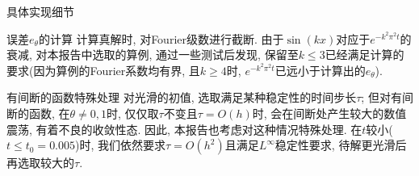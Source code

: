 \documentclass{article}
\begin{document}
\begin{section}{具体实现细节}
\begin{subsection}{误差$e_\theta$的计算}
        计算真解时, 对Fourier级数进行截断. 由于$\sin(kx)$对应于$e^{-k^2\pi^2t}$的衰减, 对本报告中选取的算例, 通过一些测试后发现, 
        保留至$k\leq 3$已经满足计算的要求(因为算例的Fourier系数均有界, 且$k\geq 4$时, $e^{-k^2\pi^2 t}$已远小于计算出的$e_\theta$).
    \end{subsection}
    \begin{subsection}{有间断的函数特殊处理}
        对光滑的初值, 选取满足某种稳定性的时间步长$\tau$; 但对有间断的函数, 在$\theta\neq 0,1$时, 仅仅取$\tau$不变且$\tau=O(h)$时, 会在间断处产生较大的数值震荡, 有着不良的收敛性态.
        因此, 本报告也考虑对这种情况特殊处理. 在$t$较小($t\leq t_0=0.005$)时, 我们依然要求$\tau=O(h^2)$且满足$L^\infty$稳定性要求, 待解更光滑后再选取较大的$\tau$.
    \end{subsection}
\end{section}
\end{document}
